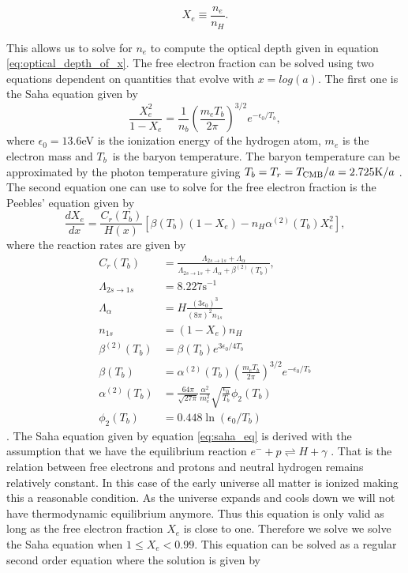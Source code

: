 \documentclass[onecolumn]{aastex62}
\begin{document}
\begin{equation}\label{eq:Xe}
    X_e\equiv\frac{n_e}{n_H}.
\end{equation}
 
This allows us to solve for $n_e$ to compute the optical depth given in equation \ref{eq:optical_depth_of_x}. The free electron fraction can be solved using two equations dependent on quantities that evolve with $x=log(a)$. The first one is the Saha equation given by
\begin{equation}\label{eq:saha_eq}
    \frac{X_e^2}{1-X_e} = \frac{1}{n_b} \left(\frac{m_eT_b}{2\pi}\right)^{3/2} e^{-\epsilon_0/T_b},
\end{equation}
where $\epsilon_0=13.6$eV is the ionization energy of the hydrogen atom, $m_e$ is the electron mass and $T_b$ is the baryon temperature. The baryon temperature can be approximated by the photon temperature giving $T_b =
T_r = T_{\rm CMB} / a = 2.725 \textrm{K} / a$ \cite{WintherII:2020}. The second equation one can use to solve for the free electron fraction is the Peebles' equation given by
\begin{equation}\label{eq:peeble_eq}
    \frac{dX_e}{dx} = \frac{C_r(T_b)}{H(x)} \left[\beta(T_b)(1-X_e) - n_H\alpha^{(2)}(T_b)X_e^2\right],
\end{equation}
where the reaction rates are given by
\begin{align}
    C_r(T_b) &= \frac{\Lambda_{2s\rightarrow1s} +
    \Lambda_{\alpha}}{\Lambda_{2s\rightarrow1s} + \Lambda_{\alpha} +
    \beta^{(2)}(T_b)}, \\
    \Lambda_{2s\rightarrow1s} &= 8.227 \textrm{s}^{-1}\\
    \Lambda_{\alpha} &= H\frac{(3\epsilon_0)^3}{(8\pi)^2 n_{1s}}\\
    n_{1s} &= (1-X_e)n_H \\
    \beta^{(2)}(T_b) &= \beta(T_b) e^{3\epsilon_0/4T_b} \\
    \beta(T_b) &= \alpha^{(2)}(T_b) \left(\frac{m_e
    T_b}{2\pi}\right)^{3/2} e^{-\epsilon_0/T_b} \\
    \alpha^{(2)}(T_b) &= \frac{64\pi}{\sqrt{27\pi}}
    \frac{\alpha^2}{m_e^2}\sqrt{\frac{\epsilon_0}{T_b}}\phi_2(T_b) \\
    \phi_2(T_b) &= 0.448\ln(\epsilon_0/T_b)
\end{align}
\cite{WintherII:2020}. The Saha equation given by equation \ref{eq:saha_eq} is derived with the assumption that we have the equilibrium reaction $e^- +p\rightleftharpoons H+\gamma$ \cite[p.70]{Dodelson:1282338}. That is the relation between free electrons and protons and neutral hydrogen remains relatively constant. In this case of the early universe all matter is ionized making this a reasonable condition. As the universe expands and cools down we will not have thermodynamic equilibrium anymore. Thus this equation is only valid as long as the free electron fraction $X_e$ is close to one. Therefore we solve we solve the Saha equation when $1\leq X_e<0.99$. This equation can be solved as a regular second order equation where the solution is given by
\end{document}
